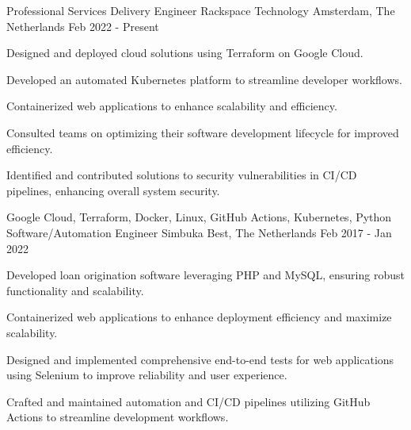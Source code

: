 

\begin{cventries}

  \cventry
    {Professional Services Delivery Engineer} %
    {Rackspace Technology} %
    {Amsterdam, The Netherlands} %
    {Feb 2022 - Present} %
    {
      \begin{cvitems} %
        \item {Designed and deployed cloud solutions using Terraform on Google Cloud.}
        \item {Developed an automated Kubernetes platform to streamline developer workflows. }
        \item {Containerized web applications to enhance scalability and efficiency.  }
        \item {Consulted teams on optimizing their software development lifecycle for improved efficiency.  }
        \item {Identified and contributed solutions to security vulnerabilities in CI/CD pipelines, enhancing overall system security.}
      \end{cvitems}
    }
    {Google Cloud, Terraform, Docker, Linux, GitHub Actions, Kubernetes, Python}
  \cventry
    {Software/Automation Engineer} %
    {Simbuka} %
    {Best, The Netherlands} %
    {Feb 2017 - Jan 2022} %
    {
      \begin{cvitems} %
        \item {Developed loan origination software leveraging PHP and MySQL, ensuring robust functionality and scalability.}
        \item {Containerized web applications to enhance deployment efficiency and maximize scalability.}
        \item {Designed and implemented comprehensive end-to-end tests for web applications using Selenium to improve reliability and user experience.}
        \item {Crafted and maintained automation and CI/CD pipelines utilizing GitHub Actions to streamline development workflows.}

\end{cvitems}}
\end{cventries}
